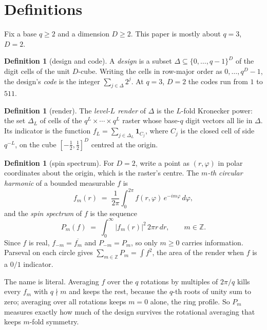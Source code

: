 \documentclass[11pt]{amsart}
\theoremstyle{definition}
\newtheorem{definition}[theorem]{Definition}
\theoremstyle{remark}
\begin{document}
\section{Definitions}
\label{sec:defs}

Fix a base $q \ge 2$ and a dimension $D \ge 2$. This paper is mostly about $q = 3$, $D = 2$.

\begin{definition}[design and code]
\label{def:design}
A \emph{design} is a subset $\Delta \subseteq \{0, \dots, q-1\}^D$ of the digit cells of the unit $D$-cube. Writing the cells in row-major order as $0, \dots, q^D - 1$, the design's \emph{code} is the integer $\sum_{j \in \Delta} 2^{j}$. At $q = 3$, $D = 2$ the codes run from $1$ to $511$.
\end{definition}

\begin{definition}[render]
\label{def:render}
The \emph{level-$L$ render} of $\Delta$ is the $L$-fold Kronecker power: the set $\Delta_L$ of cells of the $q^L \times \cdots \times q^L$ raster whose base-$q$ digit vectors all lie in $\Delta$. Its indicator is the function $f_L = \sum_{j \in \Delta_L} \mathbf 1_{C_j}$, where $C_j$ is the closed cell of side $q^{-L}$, on the cube $[-\tfrac12, \tfrac12]^D$ centred at the origin.
\end{definition}

\begin{definition}[spin spectrum]
\label{def:spectrum}
For $D = 2$, write a point as $(r, \varphi)$ in polar coordinates about the origin, which is the raster's centre. The \emph{$m$-th circular harmonic} of a bounded measurable $f$ is
\[
f_m(r) \;=\; \frac{1}{2\pi}\int_0^{2\pi} f(r, \varphi)\, e^{-i m \varphi}\, d\varphi ,
\]
and the \emph{spin spectrum} of $f$ is the sequence
\[
P_m(f) \;=\; \int_0^\infty |f_m(r)|^2 \, 2\pi r \, dr , \qquad m \in \mathbb Z .
\]
Since $f$ is real, $f_{-m} = \overline{f_m}$ and $P_{-m} = P_m$, so only $m \ge 0$ carries information. Parseval on each circle gives $\sum_{m \in \mathbb Z} P_m = \int f^2$, the area of the render when $f$ is a $0/1$ indicator.
\end{definition}

The name is literal. Averaging $f$ over the $q$ rotations by multiples of $2\pi/q$ kills every $f_m$ with $q \nmid m$ and keeps the rest, because the $q$-th roots of unity sum to zero; averaging over all rotations keeps $m = 0$ alone, the ring profile. So $P_m$ measures exactly how much of the design survives the rotational averaging that keeps $m$-fold symmetry.
\end{document}
